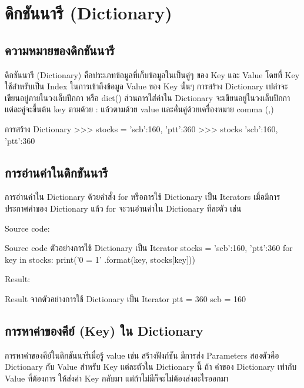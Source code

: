 \chapter{ดิกชันนารี (Dictionary)}
\section{ความหมายของดิกชันนารี}

ดิกชันนารี (Dictionary) คือประเภทข้อมูลที่เก็บข้อมูลในเป็นคู่ๆ ของ Key และ Value โดยที่ Key ใช้สำหรับเป็น Index ในการเข้าถึงข้อมูล Value ของ Key นั้นๆ การสร้าง Dictionary เปล่าจะเขียนอยู่ภายในวงเล็บปีกกา { } หรือ dict() ส่วนการใส่ค่าใน Dictionary จะเขียนอยู่ในวงเล็บปีกกา แต่ละคู่จะขึ้นต้น key ตามด้วย : แล้วตามด้วย value และคั่นคู่ด้วยเครื่องหมาย comma (,) 

\begin{codelist}{การสร้าง Dictionary}{}
>>> stocks = {'scb':160, 'ptt':360}
>>> stocks
{'scb':160, 'ptt':360}
\end{codelist}


\section{การอ่านค่าในดิกชันนารี}

การอ่านค่าใน Dictionary ด้วยคำสั่ง for หรือการใช้ Dictionary เป็น Iterators เมื่อมีการประกาศค่าของ Dictionary แล้ว for จะวนอ่านค่าใน Dictionary ทีละตัว เช่น 

Source code:
\begin{codelist}{Source code ตัวอย่างการใช้ Dictionary เป็น Iterator}{}
stocks = {'scb':160, 'ptt':360}
for key in stocks:
    print('{0} = {1}' .format(key, stocks[key]))
\end{codelist}

Result:
\begin{codelist}{Result จากตัวอย่างการใช้ Dictionary เป็น Iterator}{}
ptt = 360
scb = 160
\end{codelist}


\section{การหาค่าของคีย์ (Key) ใน Dictionary}
การหาค่าของคีย์ในดิกชันนารีเมื่อรู้ value เช่น สร้างฟังก์ชัน  มีการส่ง Parameters สองตัวคือ Dictionary กับ Value สำหรับ Key แต่ละตัวใน Dictionary นี้ ถ้า ค่าของ Dictionary เท่ากับ Value ที่ต้องการ ให้ส่งค่า Key กลับมา แต่ถ้าไม่มีก็จะไม่ต้องส่งอะไรออกมา

